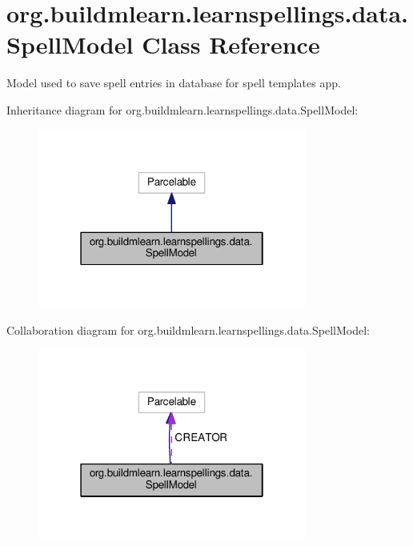 \hypertarget{classorg_1_1buildmlearn_1_1learnspellings_1_1data_1_1SpellModel}{}\section{org.\+buildmlearn.\+learnspellings.\+data.\+Spell\+Model Class Reference}
\label{classorg_1_1buildmlearn_1_1learnspellings_1_1data_1_1SpellModel}


Model used to save spell entries in database for spell template\textquotesingle{}s app.  




Inheritance diagram for org.\+buildmlearn.\+learnspellings.\+data.\+Spell\+Model\+:
\nopagebreak
\begin{figure}[H]
\begin{center}
\leavevmode
\includegraphics[width=250pt]{classorg_1_1buildmlearn_1_1learnspellings_1_1data_1_1SpellModel__inherit__graph}
\end{center}
\end{figure}


Collaboration diagram for org.\+buildmlearn.\+learnspellings.\+data.\+Spell\+Model\+:
\nopagebreak
\begin{figure}[H]
\begin{center}
\leavevmode
\includegraphics[width=250pt]{classorg_1_1buildmlearn_1_1learnspellings_1_1data_1_1SpellModel__coll__graph}
\end{center}
\end{figure}
